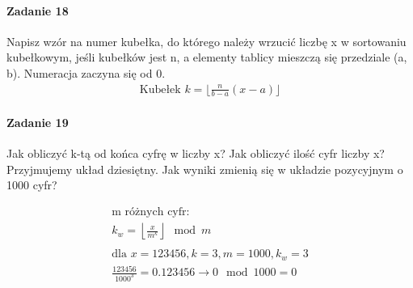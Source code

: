 \documentclass[18pt]{extarticle}
\begin{document}
\paragraph{Zadanie 18} Napisz wzór na numer kubełka, do którego należy wrzucić liczbę x w sortowaniu kubełkowym, jeśli kubełków jest n, a elementy tablicy mieszczą się przedziale (a, b). Numeracja zaczyna się od 0.\\


\begin{align*}
    \text{Kubełek }k = \lfloor\frac{n}{b-a} (x-a)\rfloor
\end{align*}

\paragraph{Zadanie 19} Jak obliczyć k-tą od końca cyfrę w liczby x? Jak obliczyć ilość cyfr liczby x? Przyjmujemy układ dziesiętny. Jak wyniki zmienią się w układzie pozycyjnym o 1000 cyfr?

\begin{gather*}
    \text{m różnych cyfr:} \\
    k_w = \left \lfloor \frac{x}{m^k} \right \rfloor \mod m \\ \\
    \text{dla }x = 123456, k = 3, m = 1000, k_w = 3 \\
    \frac{123456}{1000^3} = 0.123456 \rightarrow 0 \mod 1000 = 0 \\ \\
\end{gather*}
\end{document}
